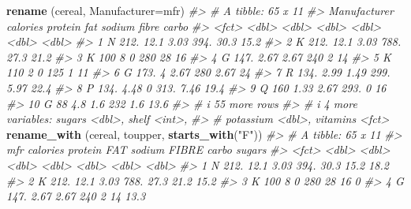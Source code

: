 \documentclass[
]{book}
\newenvironment{Shaded}{\begin{snugshade}}{\end{snugshade}}
\newcommand{\AttributeTok}[1]{\textcolor[rgb]{0.13,0.29,0.53}{#1}}
\newcommand{\CommentTok}[1]{\textcolor[rgb]{0.56,0.35,0.01}{\textit{#1}}}
\newcommand{\FunctionTok}[1]{\textcolor[rgb]{0.13,0.29,0.53}{\textbf{#1}}}
\newcommand{\NormalTok}[1]{#1}
\newcommand{\StringTok}[1]{\textcolor[rgb]{0.31,0.60,0.02}{#1}}
\begin{document}
\begin{Shaded}
\begin{Highlighting}[]
\FunctionTok{rename}\NormalTok{ (cereal, }\AttributeTok{Manufacturer=}\NormalTok{mfr)}
\CommentTok{\#\textgreater{} \# A tibble: 65 x 11}
\CommentTok{\#\textgreater{}    Manufacturer calories protein   fat sodium fibre carbo}
\CommentTok{\#\textgreater{}    \textless{}fct\textgreater{}           \textless{}dbl\textgreater{}   \textless{}dbl\textgreater{} \textless{}dbl\textgreater{}  \textless{}dbl\textgreater{} \textless{}dbl\textgreater{} \textless{}dbl\textgreater{}}
\CommentTok{\#\textgreater{}  1 N                212.   12.1   3.03   394. 30.3   15.2}
\CommentTok{\#\textgreater{}  2 K                212.   12.1   3.03   788. 27.3   21.2}
\CommentTok{\#\textgreater{}  3 K                100     8     0      280  28     16  }
\CommentTok{\#\textgreater{}  4 G                147.    2.67  2.67   240   2     14  }
\CommentTok{\#\textgreater{}  5 K                110     2     0      125   1     11  }
\CommentTok{\#\textgreater{}  6 G                173.    4     2.67   280   2.67  24  }
\CommentTok{\#\textgreater{}  7 R                134.    2.99  1.49   299.  5.97  22.4}
\CommentTok{\#\textgreater{}  8 P                134.    4.48  0      313.  7.46  19.4}
\CommentTok{\#\textgreater{}  9 Q                160     1.33  2.67   293.  0     16  }
\CommentTok{\#\textgreater{} 10 G                 88     4.8   1.6    232   1.6   13.6}
\CommentTok{\#\textgreater{} \# i 55 more rows}
\CommentTok{\#\textgreater{} \# i 4 more variables: sugars \textless{}dbl\textgreater{}, shelf \textless{}int\textgreater{},}
\CommentTok{\#\textgreater{} \#   potassium \textless{}dbl\textgreater{}, vitamins \textless{}fct\textgreater{}}
\FunctionTok{rename\_with}\NormalTok{ (cereal, toupper, }\FunctionTok{starts\_with}\NormalTok{(}\StringTok{"F"}\NormalTok{))}
\CommentTok{\#\textgreater{} \# A tibble: 65 x 11}
\CommentTok{\#\textgreater{}    mfr   calories protein   FAT sodium FIBRE carbo sugars}
\CommentTok{\#\textgreater{}    \textless{}fct\textgreater{}    \textless{}dbl\textgreater{}   \textless{}dbl\textgreater{} \textless{}dbl\textgreater{}  \textless{}dbl\textgreater{} \textless{}dbl\textgreater{} \textless{}dbl\textgreater{}  \textless{}dbl\textgreater{}}
\CommentTok{\#\textgreater{}  1 N         212.   12.1   3.03   394. 30.3   15.2  18.2 }
\CommentTok{\#\textgreater{}  2 K         212.   12.1   3.03   788. 27.3   21.2  15.2 }
\CommentTok{\#\textgreater{}  3 K         100     8     0      280  28     16     0   }
\CommentTok{\#\textgreater{}  4 G         147.    2.67  2.67   240   2     14    13.3 }

\end{Highlighting}
\end{Shaded}
\end{document}
